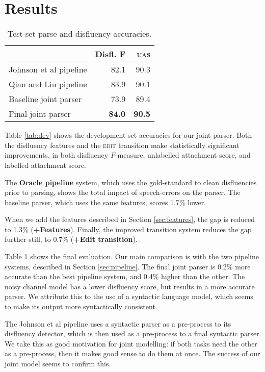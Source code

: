 \documentclass[11pt,letterpaper]{article}
\begin{document}
\section{Results}
\label{sec:results}

\begin{table}
    \small
    \centering
    \begin{tabular}{l|r|r}
        & Disfl. F & \textsc{uas} \\
        \hline \hline
Johnson et al pipeline      & 82.1 & 90.3 \\ 
Qian and Liu  pipeline     & 83.9 & 90.1  \\
\hline
Baseline joint parser & 73.9 & 89.4 \\
Final joint parser    & \textbf{84.0} & \textbf{90.5} \\
\hline
    \end{tabular}
    \caption{Test-set parse and disfluency accuracies.\label{tab:test}}
\vspace*{-1.0ex}
\end{table}

Table \ref{tab:dev} shows the development set accuracies for our joint parser.
Both the disfluency features and the 
\textsc{edit} transition make statistically significant improvements, in both
disfluency $F$-measure, unlabelled attachment score, and labelled attachment score.

The \textbf{Oracle pipeline} system, which uses the gold-standard to clean disfluencies
prior to parsing, shows the total impact of speech-errors on the parser.  The
baseline parser, which uses the same features, scores 1.7\% lower.

When we add the features described in Section \ref{sec:features}, the gap is reduced
to 1.3\% (\textbf{+Features}).  Finally, the improved transition system reduces
the gap further still, to 0.7\% (\textbf{+Edit transition}).

Table \ref{tab:test} shows the final evaluation.  
Our main comparison is with the two pipeline systems, described in Section
\ref{sec:pipeline}. 
The final joint parser is 0.2\% more accurate than the best pipeline system, and
0.4\% higher than the other.
The \citet{Johnson04a} noisy channel model has a lower
disfluency score, but results in a more accurate parser. We attribute this to
the use of a syntactic language model, which seems to make its output more syntactically
consistent.

The Johnson et al pipeline uses a syntactic parser as a pre-process to its
disfluency detector, which is then used as a pre-process to a final syntactic
parser.  We take this as good motivation for joint modelling: if both tasks need
the other as a pre-process, then it makes good sense to do them at once.  The
success of our joint model seems to confirm this.
\end{document}
